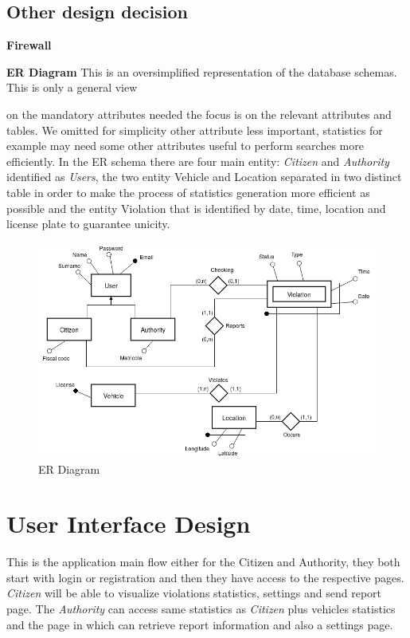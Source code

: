 \documentclass{article}
\begin{document}
\subsection{Other design decision}
\textbf{Firewall}

\textbf{ER Diagram}
This is an oversimplified representation of the database schemas. This is only a general view 

on the mandatory attributes needed the focus is on the relevant attributes and tables. We omitted 
for simplicity other attribute less important, statistics for example may need some other attributes 
useful to perform searches more efficiently. In the ER schema there are four main entity:  
\textit{Citizen} and \textit{Authority} identified as \textit{Users}, the two entity Vehicle and 
Location separated in two distinct table in order to make the process of statistics generation more 
efficient as possible and the entity Violation that is identified by date, time, location and license 
plate to guarantee unicity. 

\begin{figure}[H]
    \centering
    \includegraphics[scale=0.5]{img/ER_diagram.png}
    \caption{ER Diagram}
\end{figure}

\clearpage

\section{User Interface Design} 
This is the application main flow either for the Citizen and Authority, they both start with login 
or registration and then they have access to the respective pages. \textit{Citizen} will be able to 
visualize violations statistics, settings and send report page. The \textit{Authority} can access 
same statistics as \textit{Citizen} plus vehicles statistics and the page in which can retrieve report 
information and also a settings page.
\end{document}

